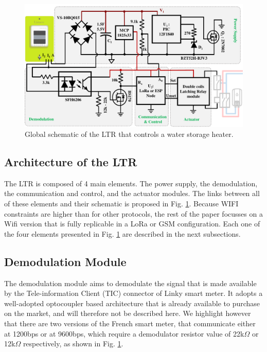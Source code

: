 \documentclass[conference]{IEEEtran}
\begin{document}
\begin{figure}[h]
	\centering
	\includegraphics[width=1\columnwidth]{Images/schematic.pdf}
	\caption{Global schematic of the LTR that controls a water storage heater.}
	\label{Fig:schematic}
\end{figure}

\subsection{Architecture of the LTR}
The LTR is composed of 4 main elements. The power supply, the demodulation, the communication and control, and the actuator modules.   The links between all of these elements and their schematic is proposed in Fig. \ref{Fig:schematic}. Because WIFI constraints are higher than for other protocols, the rest of the paper focusses on a Wifi version
 that is fully replicable in a LoRa or GSM configuration. Each one of the four elements presented in Fig. \ref{Fig:schematic} are described in the next subsections.





\subsection{Demodulation Module}
The demodulation module aims to demodulate the signal that is made available by the Tele-information Client (TIC) connector of Linky smart meter. It adopts a well-adopted optocoupler based architecture that is already available to purchase on the market, and will therefore not be described here. We highlight however that there are two versions of the French smart meter, that communicate either at 1200bps or at 9600bps, which require a demodulator resistor value of 
22k$\Omega$ or 12k$\Omega$ respectively, as  shown in Fig. \ref{Fig:schematic}. 
\end{document}

